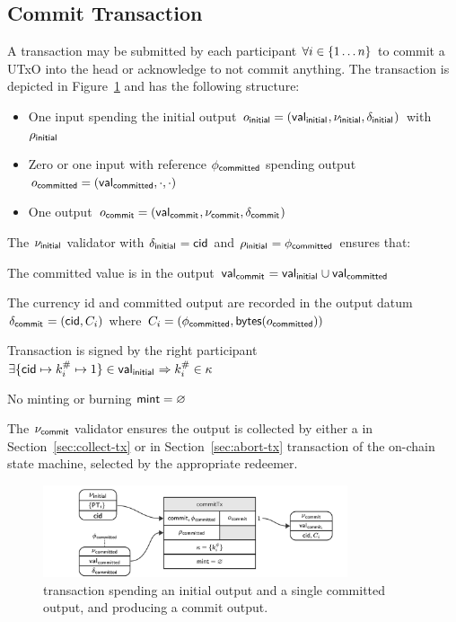 \subsection{Commit Transaction}\label{sec:commit-tx}

A \mtxCom{} transaction may be submitted by each participant
$\forall i \in \{1 \dots n\}$ to commit a UTxO into the head or acknowledge
to not commit anything. The transaction is depicted in Figure~\ref{fig:commitTx}
and has the following structure:
\begin{itemize}
	\item One input spending the initial output
	      $o_{\mathsf{initial}} = (\mathsf{val}_{\mathsf{initial}_{}}, \nu_{\mathsf{initial}}, \delta_{\mathsf{initial}_{}})$ with
	      $\rho_{\mathsf{initial}_{}}$
	\item Zero or one input with reference $\phi_{\mathsf{committed}}$
	      spending output
	      $o_{\mathsf{committed}} = (\mathsf{val}_{\mathsf{committed}}, \cdot , \cdot)$
	\item One output
	      $o_{\mathsf{commit}} = (\mathsf{val}_{\mathsf{commit}_{}}, \nu_{\mathsf{commit}}, \delta_{\mathsf{commit}_{}})$
\end{itemize}

\noindent The $\nu_{\mathsf{initial}}$ validator with $\delta_{\mathsf{initial}_{}} = \mathsf{cid}$ and
$\rho_{\mathsf{initial}_{}} = \phi_{\mathsf{committed}}$ ensures that:
\begin{menumerate}
	\item The committed value is in the output
	$\mathsf{val}_{\mathsf{commit}_{}} = \mathsf{val}_{\mathsf{initial}_{}} \cup \mathsf{val}_{\mathsf{committed}}$
	\item The currency id and committed output are recorded in the output datum
	$\delta_{\mathsf{commit}_{}} = (\mathsf{cid}, C_{i})$ where
	$C_{i} = (\phi_{\mathsf{committed}},\mathsf{bytes}(o_{\mathsf{committed}}))$
	\item Transaction is signed by the right participant
	$\exists \{\mathsf{cid} \mapsto k^{\#}_{i} \mapsto 1\} \in \mathsf{val}_{\mathsf{initial}_{}} \Rightarrow k^{\#}_{i} \in \kappa$
	\item No minting or burning $\mathsf{mint} = \varnothing$
\end{menumerate}

\noindent The $\nu_{\mathsf{commit}}$ validator ensures the output is collected by either a
\mtxCCom{} in Section~\ref{sec:collect-tx} or \mtxAbort{} in
Section~\ref{sec:abort-tx} transaction of the on-chain state machine, selected
by the appropriate redeemer.

\begin{figure}[h] \centering
	\includegraphics[width=0.8\textwidth]{figures/commitTx.pdf}
	\caption{\mtxCom{} transaction spending an initial output and a single
		committed output, and producing a commit output.}\label{fig:commitTx}
\end{figure}

